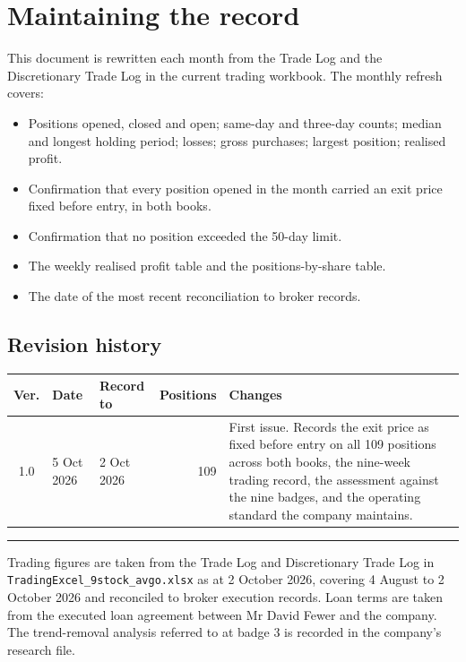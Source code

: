 \documentclass[11pt]{article}
\begin{document}
\section{Maintaining the record}

This document is rewritten each month from the Trade Log and the Discretionary Trade Log in the
current trading workbook. The monthly refresh covers:

\begin{itemize}[leftmargin=1.4em,itemsep=0.15em]
\item Positions opened, closed and open; same-day and three-day counts; median and longest holding
      period; losses; gross purchases; largest position; realised profit.
\item Confirmation that every position opened in the month carried an exit price fixed before
      entry, in both books.
\item Confirmation that no position exceeded the 50-day limit.
\item The weekly realised profit table and the positions-by-share table.
\item The date of the most recent reconciliation to broker records.
\end{itemize}

\subsection{Revision history}

\begin{center}
\footnotesize
\begin{tabular}{@{}c l l r p{6.3cm}@{}}
\toprule
\textbf{Ver.} & \textbf{Date} & \textbf{Record to} & \textbf{Positions} & \textbf{Changes} \\
\midrule
1.0 & 5 Oct 2026 & 2 Oct 2026 & 109 & First issue. Records the exit price as fixed before entry on
  all 109 positions across both books, the nine-week trading record, the assessment against the
  nine badges, and the operating standard the company maintains. \\
\bottomrule
\end{tabular}
\end{center}

\vspace{0.6em}
{\color{bcrule}\rule{\textwidth}{0.6pt}}

{\footnotesize\color{bcgrey}
Trading figures are taken from the Trade Log and Discretionary Trade Log in
\texttt{TradingExcel\_9stock\_avgo.xlsx} as at 2 October 2026, covering 4 August to 2 October 2026
and reconciled to broker execution records. Loan terms are taken from the executed loan agreement
between Mr David Fewer and the company. The trend-removal analysis referred to at badge 3 is
recorded in the company's research file.}
\end{document}
